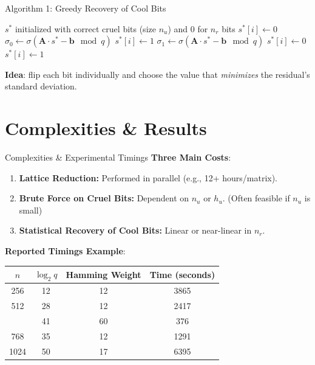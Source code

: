 \documentclass{beamer}
\begin{document}
\begin{frame}[fragile]{Algorithm 1: Greedy Recovery of Cool Bits}
\footnotesize
\begin{algorithm}[H]
\caption{Greedy Recovery of Cool Bits}
\begin{algorithmic}[1]
\Require $s^*$ initialized with correct cruel bits (size $n_u$) and 0 for $n_r$ bits
  \State $s^*[i] \gets 0$
  \State $\sigma_0 \gets \sigma(\mathbf{A}\cdot s^* - \mathbf{b} \mod q)$
  \State $s^*[i] \gets 1$
  \State $\sigma_1 \gets \sigma(\mathbf{A}\cdot s^* - \mathbf{b} \mod q)$
    \State $s^*[i] \gets 0$
  \Else
    \State $s^*[i] \gets 1$
  \EndIf
\EndFor
\end{algorithmic}
\end{algorithm}

\vspace{0.2cm}
\textbf{Idea}: flip each bit individually and choose the value that \emph{minimizes} the residual's standard deviation.
\end{frame}

\section{Complexities \& Results}
\begin{frame}{Complexities \& Experimental Timings}
  \textbf{Three Main Costs}:
  \begin{enumerate}
    \item \textbf{Lattice Reduction:} Performed in parallel (e.g., 12+ hours/matrix).
    \item \textbf{Brute Force on Cruel Bits:} Dependent on $n_u$ or $h_u$. (Often feasible if $n_u$ is small)
    \item \textbf{Statistical Recovery of Cool Bits:} Linear or near-linear in $n_r$.
  \end{enumerate}

  \vspace{0.2cm}
  \textbf{Reported Timings Example}:
  \begin{table}[h]
  \centering
  \scriptsize
  \begin{tabular}{cccc}
  \toprule
  $n$ & $\log_2 q$ & Hamming Weight & Time (seconds) \\
  \midrule
  256 & 12 & 12 & 3865 \\
  512 & 28 & 12 & 2417 \\
      & 41 & 60 & 376 \\
  768 & 35 & 12 & 1291 \\
  1024 & 50 & 17 & 6395 \\
  \bottomrule
  \end{tabular}
  \end{table}
\end{frame}
\end{document}
